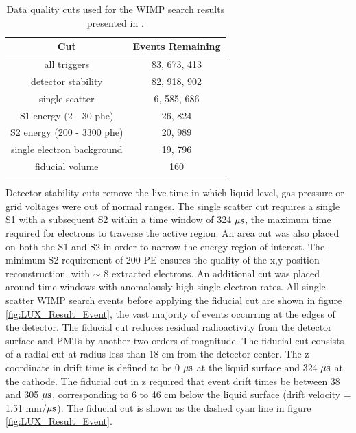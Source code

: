 \renewcommand{\baselinestretch}{1}
\small\normalsize
\begin{table}[h!]
\begin{center}
\begin{tabular}{|c|c|}
\hline
Cut & Events Remaining \\ \hline
all triggers & 83, 673, 413 \\ \hline
detector stability & 82, 918, 902 \\ \hline
single scatter & 6, 585, 686 \\ \hline
S1 energy (2 - 30 phe) & 26, 824 \\ \hline
S2 energy (200 - 3300 phe) &  20, 989 \\ \hline
single electron background & 19, 796 \\ \hline
fiducial volume & 160 \\ \hline
\end{tabular}
\caption{Data quality cuts used for the WIMP search results presented in \cite{LUX_PRL}.}
\label{table:WIMP_Quality_Cuts}
\end{center}
\end{table}
\renewcommand{\baselinestretch}{2}
\small\normalsize

\noindent Detector stability cuts remove the live time in which liquid level, gas pressure or grid voltages were out of normal ranges. The single scatter cut requires a single S1 with a subsequent S2 within a time window of 324 $\rm \mu s$, the maximum time required for electrons to traverse the active region. An area cut was also placed on both the S1 and S2 in order to narrow the energy region of interest. The minimum S2 requirement of 200 PE ensures the quality of the x,y position reconstruction, with $\sim$ 8 extracted electrons. An additional cut was placed around time windows with anomalously high single electron rates. All single scatter WIMP search events before applying the fiducial cut are shown in figure \ref{fig:LUX_Result_Event}, the vast majority of events occurring at the edges of the detector. 
The fiducial cut reduces residual radioactivity from the detector surface and PMTs by another two orders of magnitude. The fiducial cut consists of a radial cut at radius less than 18 cm from the detector center. The z coordinate in drift time is defined to be 0 $\rm \mu s$ at the liquid surface and 324 $\rm \mu s$ at the cathode. The fiducial cut in z required that event drift times be between 38 and 305 $\rm \mu s$, corresponding to 6 to 46 cm below the liquid surface (drift velocity = 1.51 mm/$\rm \mu s$). The fiducial cut is shown as the dashed cyan line in figure \ref{fig:LUX_Result_Event}.

